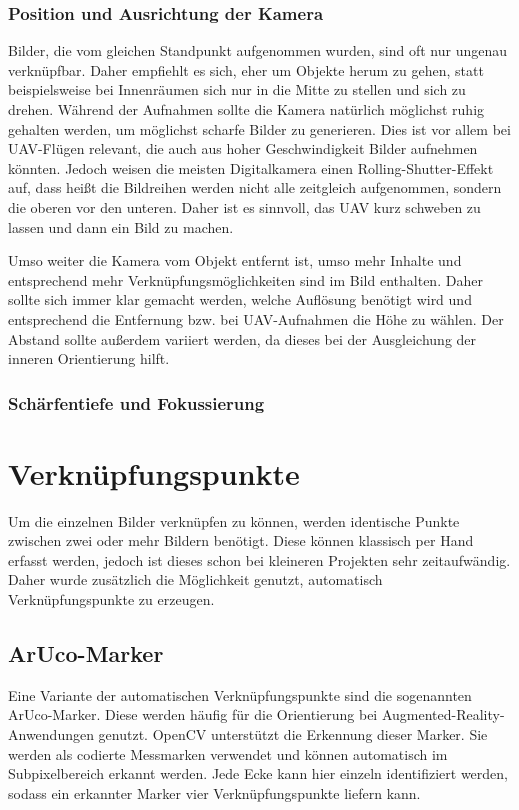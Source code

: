 \documentclass[a4paper,12pt,bibliography=totoc, listof=totoc,titlepage]{scrreprt}
\begin{document}
\subsubsection{Position und Ausrichtung der Kamera}
Bilder, die vom gleichen Standpunkt aufgenommen wurden, sind oft nur ungenau verknüpfbar. Daher empfiehlt es sich, eher um Objekte herum zu gehen, statt beispielsweise bei Innenräumen sich nur in die Mitte zu stellen und sich zu drehen. Während der Aufnahmen sollte die Kamera natürlich möglichst ruhig gehalten werden, um möglichst scharfe Bilder zu generieren. Dies ist vor allem bei UAV-Flügen relevant, die auch aus hoher Geschwindigkeit Bilder aufnehmen könnten. Jedoch weisen die meisten Digitalkamera einen Rolling-Shutter-Effekt auf, dass heißt die Bildreihen werden nicht alle zeitgleich aufgenommen, sondern die oberen vor den unteren. Daher ist es sinnvoll, das UAV kurz schweben zu lassen und dann ein Bild zu machen. \citep[S. 147]{opendronemap}

Umso weiter die Kamera vom Objekt entfernt ist, umso mehr Inhalte und entsprechend mehr Verknüpfungsmöglichkeiten sind im Bild enthalten. Daher sollte sich immer klar gemacht werden, welche Auflösung benötigt wird und entsprechend die Entfernung bzw. bei UAV-Aufnahmen die Höhe zu wählen. Der Abstand sollte außerdem variiert werden, da dieses bei der Ausgleichung der inneren Orientierung hilft. \citep[S. 144f]{opendronemap}

\subsubsection{Schärfentiefe und Fokussierung}


\section{Verknüpfungspunkte}
Um die einzelnen Bilder verknüpfen zu können, werden identische Punkte zwischen zwei oder mehr Bildern benötigt. Diese können klassisch per Hand erfasst werden, jedoch ist dieses schon bei kleineren Projekten sehr zeitaufwändig. Daher wurde zusätzlich die Möglichkeit genutzt, automatisch Verknüpfungspunkte zu erzeugen.

\subsection{ArUco-Marker}
Eine Variante der automatischen Verknüpfungspunkte sind die sogenannten ArUco-Marker. Diese werden häufig für die Orientierung bei Augmented-Reality-Anwend\-ungen genutzt. OpenCV unterstützt die Erkennung dieser Marker. Sie werden als codierte Messmarken verwendet und können automatisch im Subpixelbereich erkannt werden. Jede Ecke kann hier einzeln identifiziert werden, sodass ein erkannter Marker vier Verknüpfungspunkte liefern kann.
\end{document}
